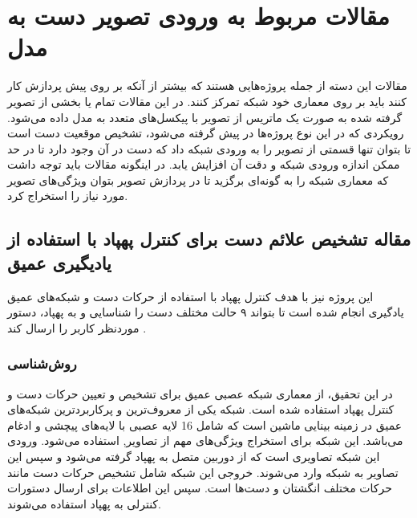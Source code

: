 




\section{مقالات مربوط به ورودی تصویر دست به مدل}
مقالات این دسته از جمله پروژه‌هایی هستند که بیشتر از آنکه بر روی پیش پردازش کار کنند باید بر روی معماری خود شبکه تمرکز کنند. در این مقالات تمام یا بخشی از تصویر گرفته شده به صورت یک ماتریس از تصویر با پیکسل‌های متعدد به مدل داده می‌شود. رویکردی که در این نوع پروژه‌ها در پیش گرفته می‌شود، تشخیص موقعیت دست است تا بتوان تنها قسمتی از تصویر را به ورودی شبکه داد که دست در آن وجود دارد تا در حد ممکن
 اندازه ورودی شبکه و دقت آن افزایش یابد. در اینگونه مقالات باید توجه داشت که معماری شبکه را به گونه‌ای برگزید تا در پردازش تصویر بتوان ویژگی‌های تصویر مورد نیاز را استخراج کرد.


\subsection[مقاله تشخيص علائم دست برای کنترل پهپاد با استفاده از یادیگیری عمیق]{مقاله تشخيص علائم دست برای کنترل پهپاد با استفاده از یادیگیری عمیق \protect{}}
این پروژه نیز با هدف کنترل پهپاد با استفاده از حرکات دست و شبکه‌های عمیق یادگیری انجام شده است تا بتواند ۹ حالت مختلف دست را شناسایی و به پهپاد، دستور موردنظر کاربر را ارسال کند \cite{hadri2018hand}.

\subsubsection{روش‌شناسی}
در این تحقیق، از معماری شبکه عصبی عمیق  برای تشخیص و تعیین حرکات دست و کنترل پهپاد استفاده شده است. شبکه  یکی از معروف‌ترین و پرکاربردترین شبکه‌های عمیق در زمینه بینایی ماشین است که 
شامل 16 لایه عصبی با لایه‌های پیچشی و ادغام  می‌باشد. این شبکه برای استخراج ویژگی‌های مهم از تصاویر, استفاده می‌شود. ورودی این شبکه تصاویری است که از دوربین متصل به پهپاد گرفته می‌شود و سپس این 
تصاویر به شبکه وارد می‌شوند. خروجی این شبکه شامل تشخیص حرکات دست مانند حرکات مختلف انگشتان و دست‌ها است. سپس این اطلاعات برای ارسال دستورات کنترلی به پهپاد استفاده می‌شوند. 

